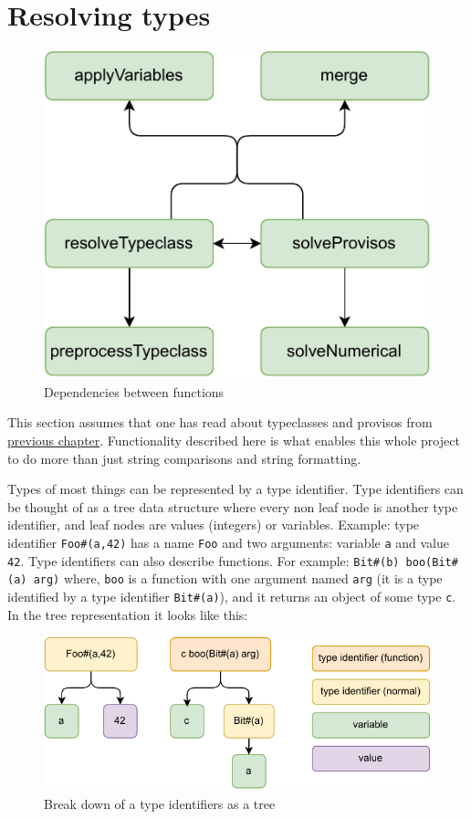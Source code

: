 \documentclass[12pt]{report}
\begin{document}
\section{Resolving types}
\begin{figure}[!h]
    \centering
    \caption{Dependencies between functions}

    \includegraphics[width=0.5\columnwidth]{pdfExports/LargeMapResolve.pdf}
\end{figure}
This section assumes that one has read about typeclasses and provisos from \hyperref[sec:Typeclasses]{previous chapter}.
Functionality described here is what enables this whole project to do more than just string comparisons and string formatting. 
\par
Types of most things can be represented by a type identifier.
Type identifiers can be thought of as a tree data structure where every non leaf node is another type identifier, and leaf nodes are values (integers) or variables. 
Example: type identifier \verb!Foo#(a,42)! has a name \verb!Foo! and two arguments: variable \verb!a! and value \verb!42!.
Type identifiers can also describe functions.
For example: \verb!Bit#(b) boo(Bit#(a) arg)! where, 
\verb!boo! is a function with one argument named \verb!arg! (it is a type identified by a type identifier \verb!Bit#(a)!), and it returns an object of some type \verb!c!. In the tree representation it looks like this:
\begin{figure}[H]
    \centering
    \caption{Break down of a type identifiers as a tree}
    \includegraphics[width=0.7\columnwidth]{pdfExports/LargeMap-FunctionBreakDown.drawio.pdf}
\end{figure}
\end{document}
